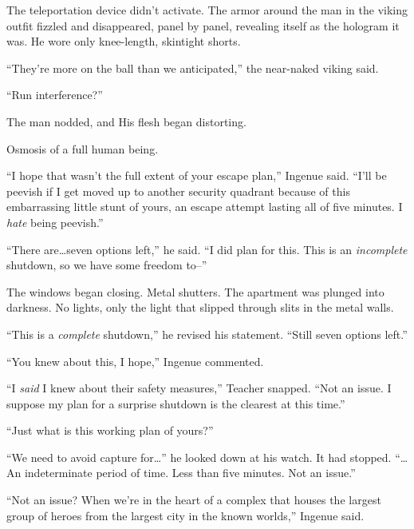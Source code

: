 The teleportation device didn't activate.  The armor around the man in the viking outfit fizzled and disappeared, panel by panel, revealing itself as the hologram it was.  He wore only knee-length, skintight shorts.



``They're more on the ball than we anticipated,'' the near-naked viking said.



``Run interference?''



The man nodded, and His flesh began distorting.



Osmosis of a full human being.



``I hope that wasn't the full extent of your escape plan,'' Ingenue said.  ``I'll be peevish if I get moved up to another security quadrant because of this embarrassing little stunt of yours, an escape attempt lasting all of five minutes.  I \emph{hate} being peevish.''



``There are\ldots seven options left,'' he said.  ``I did plan for this.  This is an \emph{incomplete} shutdown, so we have some freedom to--''



The windows began closing.  Metal shutters.  The apartment was plunged into darkness.  No lights, only the light that slipped through slits in the metal walls.



``This is a \emph{complete} shutdown,'' he revised his statement.  ``Still seven options left.''



``You knew about this, I hope,'' Ingenue commented.



``I \emph{said} I knew about their safety measures,'' Teacher snapped.  ``Not an issue.  I suppose my plan for a surprise shutdown is the clearest at this time.''



``Just what is this working plan of yours?''



``We need to avoid capture for\ldots'' he looked down at his watch.  It had stopped.  ``\ldots{}An indeterminate period of time.  Less than five minutes.  Not an issue.''



``Not an issue?  When we're in the heart of a complex that houses the largest group of heroes from the largest city in the known worlds,'' Ingenue said.



